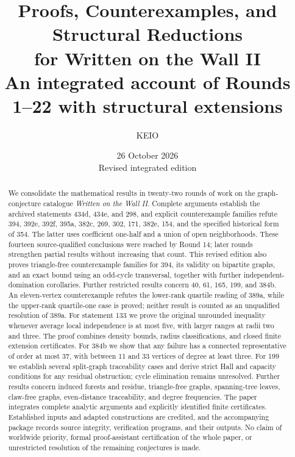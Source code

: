\documentclass[11pt,a4paper]{article}
\theoremstyle{definition}\newtheorem{definition}[theorem]{Definition}
\theoremstyle{remark}\newtheorem{remark}[theorem]{Remark}
\begin{document}
\title{Proofs, Counterexamples, and Structural Reductions\\
for Written on the Wall II\\[6pt]
\large An integrated account of Rounds 1--22 with structural extensions}
\author{KEIO}
\date{26 October 2026\\[3pt]\small Revised integrated edition}
\maketitle

\begin{abstract}
We consolidate the mathematical results in twenty-two rounds of work on
the graph-conjecture catalogue \emph{Written on the Wall II}. Complete
arguments establish the archived statements 434d, 434e, and 298, and
explicit counterexample families refute 394, 392e, 392f, 395a, 382c, 269,
302, 171, 382e, 154, and the specified historical form of 354. The latter
uses coefficient one-half and a union of open neighborhoods. These
fourteen source-qualified conclusions were reached by Round 14; later
rounds strengthen partial results without increasing that count.
This revised edition also proves triangle-free counterexample families
for 394, its validity on bipartite graphs, and an exact bound using an
odd-cycle transversal, together with further independent-domination
corollaries. Further restricted results concern 40, 61, 165, 199, and
384b. An eleven-vertex counterexample refutes the lower-rank quartile
reading of 389a, while the upper-rank quartile-one case is proved;
neither result is counted as an unqualified resolution of 389a.
For statement 133 we prove the original unrounded inequality whenever
average local independence is at most five, with larger ranges at
radii two and three. The proof combines density bounds, radius
classifications, and closed finite extension certificates. For 384b we
show that any failure has a connected representative of order at most
37, with between 11 and 33 vertices of degree at least three. For 199
we establish several split-graph traceability cases and derive strict
Hall and capacity conditions for any residual obstruction; cycle
elimination remains unresolved. Further results concern induced
forests and residue, triangle-free graphs, spanning-tree leaves,
claw-free graphs, even-distance traceability, and degree frequencies.
The paper integrates complete analytic arguments and explicitly
identified finite certificates. Established inputs and adapted
constructions are credited, and the accompanying package records
source integrity, verification programs, and their outputs. No claim
of worldwide priority, formal proof-assistant certification of the
whole paper, or unrestricted resolution of the remaining conjectures
is made.
\end{abstract}
\end{document}
